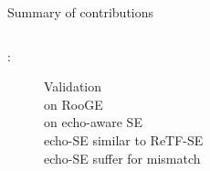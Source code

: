 \begin{frame}{Summary of contributions}
\begin{center}
\begin{columns}[T,onlytextwidth]
            \pause
            \begin{description}
                \item[\dechorate:] Validation {\footnotesize%
                    \\\cmark{} on RooGE
                    \\\cmark{} on echo-aware SE
                    \\\xmark{} echo-SE similar to ReTF-SE
                    \\\xmark{} echo-SE suffer for mismatch
                }
            \end{description}
        \end{columns}
    \end{center}
\end{frame}

